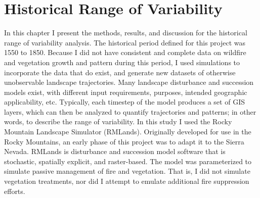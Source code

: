 
\chapter{Historical Range of Variability}
\label{ch:hrv}

In this chapter I present the methods, results, and discussion for the historical range of variability analysis. The historical period defined for this project was 1550 to 1850. Because I did not have consistent and complete data on wildfire and vegetation growth and pattern during this period, I used simulations to incorporate the data that do exist, and generate new datasets of otherwise unobservable landscape trajectories. Many landscape disturbance and succession models exist, with different input requirements, purposes, intended geographic applicability, etc. Typically, each timestep of the model produces a set of GIS layers, which can then be analyzed to quantify trajectories and patterns; in other words, to describe the range of variability. In this study I used the Rocky Mountain Landscape Simulator (RMLands). Originally developed for use in the Rocky Mountains, an early phase of this project was to adapt it to the Sierra Nevada. RMLands is disturbance and succession model software that is stochastic, spatially explicit, and raster-based. The model was parameterized to simulate passive management of fire and vegetation. That is, I did not simulate vegetation treatments, nor did I attempt to emulate additional fire suppression efforts.



